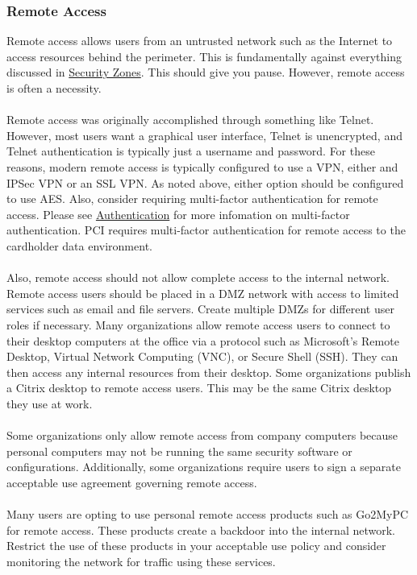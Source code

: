 \subsubsection{Remote Access}
Remote access allows users from an untrusted network such as the Internet to access resources behind the perimeter. This is fundamentally against everything discussed in \hyperref[subsec:"Security Zones"]{Security Zones}. This should give you pause. However, remote access is often a necessity.\\\\
Remote access was originally accomplished through something like Telnet. However, most users want a graphical user interface, Telnet is unencrypted, and Telnet authentication is typically just a username and password. For these reasons, modern remote access is typically configured to use a VPN, either and IPSec VPN or an SSL VPN. As noted above, either option should be configured to use AES.  Also, consider requiring multi-factor authentication for remote access. Please see \hyperref[subsubsec:"Authentication"]{Authentication} for more infomation on multi-factor authentication. PCI requires multi-factor authentication for remote access to the cardholder data environment.\\\\
Also, remote access should not allow complete access to the internal network. Remote access users should be placed in a DMZ network with access to limited services such as email and file servers. Create multiple DMZs for different user roles if necessary. Many organizations allow remote access users to connect to their desktop computers at the office via a protocol such as Microsoft's Remote Desktop, Virtual Network Computing (VNC), or Secure Shell (SSH).  They can then access any internal resources from their desktop. Some organizations  publish a Citrix desktop to remote access users. This may be the same Citrix desktop they use at work.\\\\
Some organizations only allow remote access from company computers because personal computers may not be running the same security software or configurations. Additionally, some organizations require users to sign a separate acceptable use agreement governing remote access.
\\\\Many users are opting to use personal remote access products such as Go2MyPC for remote access. These products create a backdoor into the internal network. Restrict the use of these products in your acceptable use policy and consider monitoring the network for traffic using these services.\\\\

